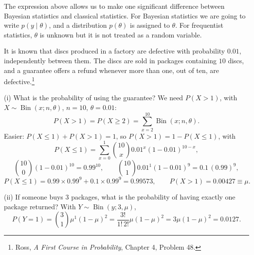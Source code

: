 \begin{remark}
The expression above allows us to make one significant difference between Bayesian statistics and classical statistics. For Bayesian statistics we are going to write $p(y \mid \theta)$, and a distribution $p(\theta)$ is assigned to $\theta$. For frequentist statistics, $\theta$ is unknown but it is not treated as a random variable.
\end{remark}

\begin{example}
It is known that discs produced in a factory are defective with probability $0.01$, independently between them. The discs are sold in packages containing $10$ discs, and a guarantee offers a refund whenever more than one, out of ten, are defective.\footnote{Ross, \emph{A First Course in Probability}, Chapter 4, Problem 48.}

(i) What is the probability of using the guarantee? We need $P(X > 1)$, with $X \sim \operatorname{Bin}(x; n, \theta)$, $n = 10$, $\theta = 0.01$:
\[
P(X > 1) = P(X \ge 2) = \sum_{x=2}^{10} \operatorname{Bin}(x; n, \theta).
\]
Easier: $P(X \le 1) + P(X > 1) = 1$, so $P(X > 1) = 1 - P(X \le 1)$, with
\[
P(X \le 1) = \sum_{x=0}^{1} \binom{10}{x} 0.01^{x}(1-0.01)^{10-x},
\]
\[
\binom{10}{0}(1-0.01)^{10} = 0.99^{10}, \qquad \binom{10}{1} 0.01^{1}(1-0.01)^{9} = 0.1\,(0.99)^{9},
\]
\[
P(X \le 1) = 0.99 \times 0.99^{9} + 0.1 \times 0.99^{9} = 0.99573,
\qquad
P(X > 1) = 0.00427 \equiv \mu.
\]

(ii) If someone buys $3$ packages, what is the probability of having exactly one package returned? With $Y \sim \operatorname{Bin}(y; 3, \mu)$,
\[
P(Y = 1) = \binom{3}{1}\mu^{1}(1-\mu)^{2} = \frac{3!}{1!\,2!}\mu(1-\mu)^2 = 3\mu(1-\mu)^2 = 0.0127.
\]
\end{example}


